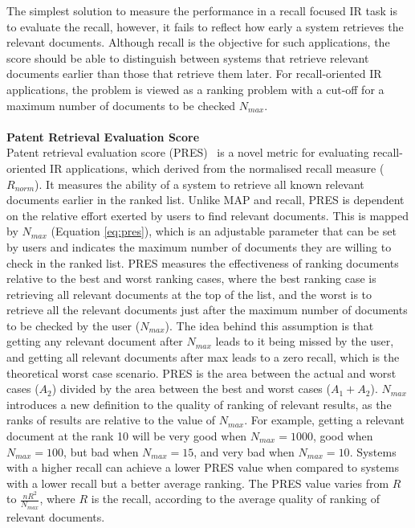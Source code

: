 The simplest solution to measure the performance in a recall focused IR task is to evaluate the recall, however, it fails to reflect how early a system retrieves the relevant documents. Although recall is the objective for such applications, the score should be able to distinguish between systems that retrieve relevant documents earlier than those that retrieve them later. For recall-oriented IR applications, the problem is viewed as a ranking problem with a cut-off for a maximum number of documents to be checked $ N_{max} $.\\\\
\textbf{Patent Retrieval Evaluation Score}
\ \\
Patent retrieval evaluation score (PRES)~\citep{magdy2010pres} is a novel metric for evaluating recall-oriented IR applications, which derived from the normalised recall measure ($ R_{norm} $). It measures the ability of a system to retrieve all known relevant documents earlier in the ranked list. Unlike MAP and recall, PRES is dependent on the relative effort exerted by users to find relevant documents. This is mapped by $ N_{max} $ (Equation \ref{eq:pres}), which is an adjustable parameter that can be set by users and indicates the maximum number of documents they are willing to check in the ranked list. PRES measures the effectiveness of ranking documents relative to the best and worst ranking cases, where the best ranking case is retrieving all relevant documents at the top of the list, and the worst is to retrieve all the relevant documents just after the maximum number of documents to
be checked by the user ($ N_{max} $). The idea behind this assumption is that getting any relevant document after $ N_{max} $ leads to it being missed by the user, and getting all relevant documents after max leads to a zero recall, which is the theoretical worst case scenario. 
PRES is the area between the actual and worst cases ($ A_{2} $) divided by the area between the best and worst cases ($ A_{1}+A_{2} $).
$ N_{max} $ introduces a new definition to the quality of ranking of relevant results, as the ranks of results are relative to the value of $ N_{max} $. For example, getting a relevant document at the rank 10 will be very good when $ N_{max}=1000 $, good when $ N_{max}=100 $, but bad when $ N_{max}=15 $, and very bad when $ N_{max}=10 $. Systems with a higher recall can achieve a lower PRES value when compared to systems with a lower recall but a better average ranking. The PRES value varies from $ R $ to $ \frac{nR^{2}}{N_{max}} $, where $ R $ is the recall, according to the average quality of ranking of relevant documents.
